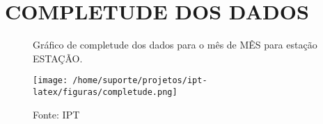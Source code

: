 \section{COMPLETUDE DOS DADOS}

\begin{figure}[htb!]
    \centering
	\captionsetup{justification=raggedright, singlelinecheck=false, width=1\textwidth}
    \caption{Gráfico de completude dos dados para o mês de MÊS para estação ESTAÇÃO.}
    \texttt{[image: /home/suporte/projetos/ipt-latex/figuras/completude.png]} %
    \caption*{Fonte: IPT}
    \label{fig:completude}
\end{figure}

